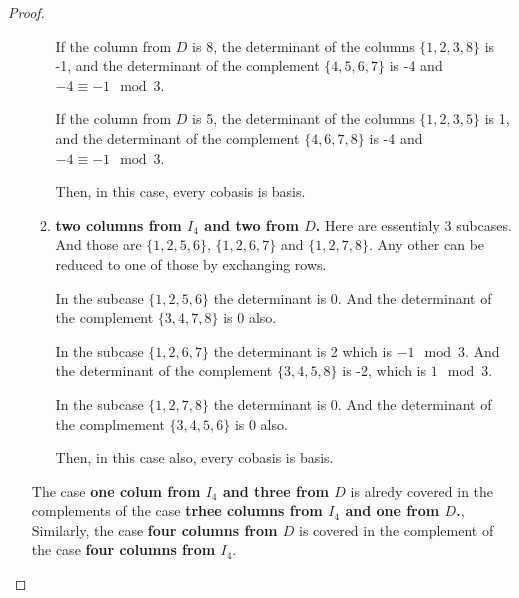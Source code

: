 \begin{proof}
\begin{enumerate}[label=(\roman*)]
\begin{enumerate}
                        If the column from $D$ is 8, the determinant of the columns $\{1, 2, 3, 8\}$ is -1, and the determinant of the complement
                        $\{4, 5, 6, 7\}$ is -4 and $-4 \equiv -1 \mod 3$.\pn
                        
                        If the column from $D$ is 5, the determinant of the columns $\{1, 2, 3, 5\}$ is 1, and the determinant of the complement
                        $\{4, 6, 7, 8\}$ is -4 and $-4 \equiv -1 \mod 3$.\pn
                        
                        Then, in this case, every cobasis is basis.\pn
                    \item \textbf{two columns from $I_4$ and two from $D$.}
                        Here are essentialy 3 subcases. And those are $\{1, 2, 5, 6\}$, $\{1, 2, 6, 7\}$ and $\{1, 2, 7, 8\}$. Any other can be
                        reduced to one of those by exchanging rows.\pn
                        
                        In the subcase $\{1, 2, 5, 6\}$ the determinant is 0. And the determinant of the complement $\{3, 4, 7, 8\}$ is 0 also.\pn
                        
                        In the subcase $\{1, 2, 6, 7\}$ the determinant is 2 which is $-1 \mod 3$. 
                        And the determinant of the complement $\{3, 4, 5, 8\}$ is -2, which is $1 \mod 3$.
                        
                        In the subcase $\{1, 2, 7, 8\}$ the determinant is 0. And the determinant of the complmement $\{3, 4, 5, 6\}$ is 0 also.\pn
                        
                        Then, in this case also, every cobasis is basis.\pn
                \end{enumerate}
                    
                The case \textbf{one colum from $I_4$ and three from $D$} is alredy covered in the complements of the case \textbf{trhee columns from $I_4$ and one from $D$.},
                Similarly, the case \textbf{four columns from $D$} is covered in the complement of the case \textbf{four columns from $I_4$}.
                

\end{enumerate}
\end{proof}

